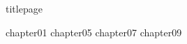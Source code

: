 \documentclass[
	,a4paper
	,12pt
	,oneside
]{book}
\begin{document}
\frontmatter
	{titlepage}
	\restoregeometry
	\tableofcontents

\mainmatter

	{chapter01}
	{chapter05}
	{chapter07}
	{chapter09}


\backmatter
\end{document}

